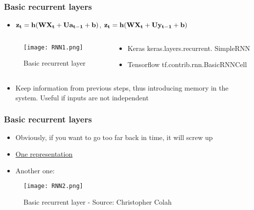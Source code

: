 \documentclass{beamer}
\begin{document}
\begin{frame}
	\frametitle{Basic recurrent layers}
    \begin{itemize}
    \item $\vb{z_t = h(WX_t+Ua_{t-1}+b)}$, $\vb{z_t = h(WX_t+Uy_{t-1}+b)}$
    \end{itemize}
    \begin{columns}[T]
    \begin{column}{.5\textwidth}
    \begin{block}{}
    \begin{figure}
		\texttt{[image: RNN1.png]}
		\caption{Basic recurrent layer}
	\end{figure}
    \end{block}
    \end{column}
    \begin{column}{.5\textwidth}
    \begin{block}{}
    \begin{itemize}
    	\item Keras
        keras.layers.recurrent.
        SimpleRNN
        \item Tensorflow
       tf.contrib.rnn.BasicRNNCell
    \end{itemize}
    \end{block}
    \end{column}
    \end{columns}
    \begin{itemize}
    \item Keep information from previous steps, thus introducing memory in the system. Useful if inputs are not independent
    \end{itemize}
    
\end{frame}

\begin{frame}
	\frametitle{Basic recurrent layers}
    \begin{itemize}
  	\item Obviously, if you want to go too far back in time, it will screw up
    \item \href{https://deeplearning4j.org/lstm.html}{One representation}
    \item Another one:
    \end{itemize}
    \begin{figure}
		\texttt{[image: RNN2.png]}
		\caption{Basic recurrent layer - Source: Christopher Colah}
	\end{figure}
\end{frame}
\end{document}
